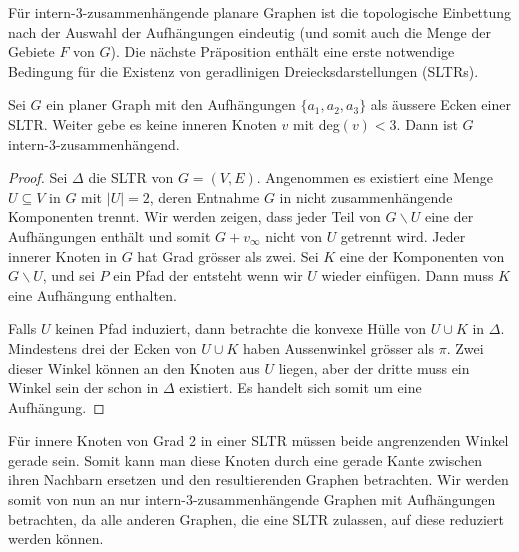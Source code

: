 Für intern-3-zusammenhängende planare Graphen ist die topologische Einbettung nach der Auswahl der Aufhängungen eindeutig (und somit auch die Menge der Gebiete $F$ von $G$). Die nächste Präposition enthält eine erste notwendige Bedingung für die Existenz von geradlinigen Dreiecksdarstellungen (SLTRs).

\begin{proposition}\cite[Proposition 1.2]{af13}
Sei $G$ ein planer Graph mit den Aufhängungen $\{a_1,a_2,a_3\}$ als äussere Ecken einer SLTR. Weiter gebe es keine inneren Knoten $v$ mit deg$(v) < 3$. Dann ist $G$ intern-3-zusammenhängend.
\end{proposition}

\begin{proof}
Sei $\Delta$ die SLTR von $G=(V,E)$. Angenommen es existiert eine Menge $U \subseteq V$ in $G$ mit $|U| = 2$, deren Entnahme $G$ in nicht zusammenhängende Komponenten trennt. Wir werden zeigen, dass jeder Teil von $G\backslash U$ eine der Aufhängungen enthält und somit $G + v_\infty$ nicht von $U$ getrennt wird. Jeder innerer Knoten in $G$ hat Grad grösser als zwei. Sei $K$ eine der Komponenten von $G\backslash U$, und sei $P$ ein Pfad der entsteht wenn wir $U$ wieder einfügen. Dann muss $K$ eine Aufhängung enthalten.

Falls $U$ keinen Pfad induziert, dann betrachte die konvexe Hülle von $U \cup K$ in $\Delta$. Mindestens drei der Ecken von $U \cup K$ haben Aussenwinkel grösser als $\pi$. Zwei dieser Winkel können an den Knoten aus $U$ liegen, aber der dritte muss ein Winkel sein der schon in $\Delta$ existiert. Es handelt sich somit um eine Aufhängung.
\end{proof}

\begin{remark}
Für innere Knoten von Grad 2 in einer SLTR müssen beide angrenzenden Winkel gerade sein. Somit kann man diese Knoten durch eine gerade Kante zwischen ihren Nachbarn ersetzen und den resultierenden Graphen betrachten. Wir werden somit von nun an nur intern-3-zusammenhängende Graphen mit Aufhängungen betrachten, da alle anderen Graphen, die eine SLTR zulassen, auf diese reduziert werden können.
\end{remark}

